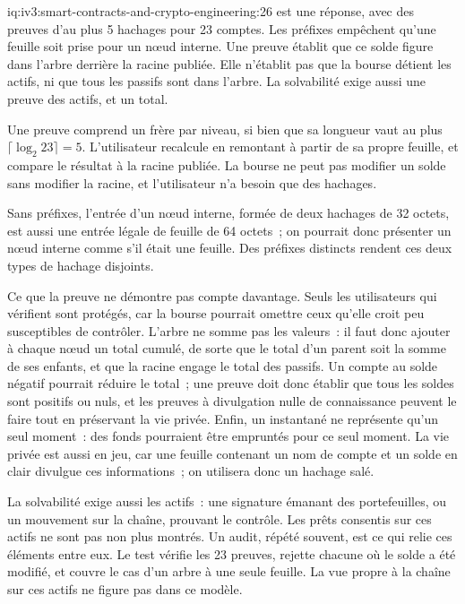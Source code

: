 \begin{solution}{iq:iv3:smart-contracts-and-crypto-engineering:26}
 est une réponse, avec des preuves d'au plus 5 hachages pour 23 comptes. Les préfixes empêchent qu'une feuille soit prise pour un nœud interne. Une preuve établit que ce solde figure dans l'arbre derrière la racine publiée. Elle n'établit pas que la bourse détient les actifs, ni que tous les passifs sont dans l'arbre. La solvabilité exige aussi une preuve des actifs, et un total.
\label{lst:iv3:cr:merkle}

Une preuve comprend un frère par niveau, si bien que sa longueur vaut au plus $\lceil \log_2 23 \rceil = 5$. L'utilisateur recalcule en remontant à partir de sa propre feuille, et compare le résultat à la racine publiée. La bourse ne peut pas modifier un solde sans modifier la racine, et l'utilisateur n'a besoin que des hachages.

Sans préfixes, l'entrée d'un nœud interne, formée de deux hachages de 32 octets, est aussi une entrée légale de feuille de 64 octets~; on pourrait donc présenter un nœud interne comme s'il était une feuille. Des préfixes distincts rendent ces deux types de hachage disjoints.

Ce que la preuve ne démontre pas compte davantage. Seuls les utilisateurs qui vérifient sont protégés, car la bourse pourrait omettre ceux qu'elle croit peu susceptibles de contrôler. L'arbre ne somme pas les valeurs~: il faut donc ajouter à chaque nœud un total cumulé, de sorte que le total d'un parent soit la somme de ses enfants, et que la racine engage le total des passifs. Un compte au solde négatif pourrait réduire le total~; une preuve doit donc établir que tous les soldes sont positifs ou nuls, et les preuves à divulgation nulle de connaissance peuvent le faire tout en préservant la vie privée. Enfin, un instantané ne représente qu'un seul moment~: des fonds pourraient être empruntés pour ce seul moment. La vie privée est aussi en jeu, car une feuille contenant un nom de compte et un solde en clair divulgue ces informations~; on utilisera donc un hachage salé.

La solvabilité exige aussi les actifs~: une signature émanant des portefeuilles, ou un mouvement sur la chaîne, prouvant le contrôle. Les prêts consentis sur ces actifs ne sont pas non plus montrés. Un audit, répété souvent, est ce qui relie ces éléments entre eux. Le test vérifie les 23 preuves, rejette chacune où le solde a été modifié, et couvre le cas d'un arbre à une seule feuille. La vue propre à la chaîne sur ces actifs ne figure pas dans ce modèle.

\end{solution}


